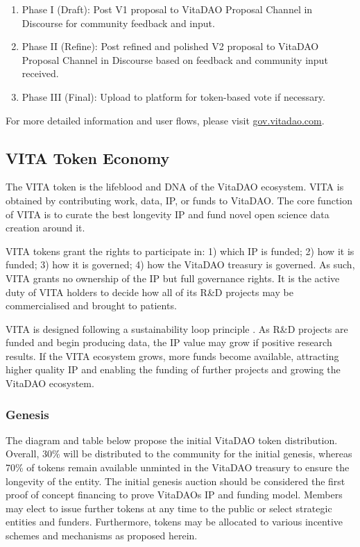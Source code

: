 \documentclass[12pt,letterpaper]{article}
\begin{document}
\begin{enumerate}
\item Phase I (Draft): Post V1 proposal to VitaDAO Proposal Channel in Discourse for community feedback and input.
\item Phase II (Refine): Post refined and polished V2 proposal to VitaDAO Proposal Channel in Discourse based on feedback and community input received.
\item Phase III (Final): Upload to platform for token-based vote if necessary.
\end{enumerate}

\noindent For more detailed information and user flows, please visit \url{gov.vitadao.com}.

\subsection{VITA Token Economy}
The VITA token is the lifeblood and DNA of the VitaDAO ecosystem. VITA is obtained by contributing work, data, IP, or funds to VitaDAO. The core function of VITA is to curate the best longevity IP and fund novel open science data creation around it.

VITA tokens grant the rights to participate in: 1) which IP is funded; 2) how it is funded; 3) how it is governed; 4) how the VitaDAO treasury is governed. As such, VITA grants no ownership of the IP but full governance rights. It is the active duty of VITA holders to decide how all of its R\&D projects may be commercialised and brought to patients.

VITA is designed following a sustainability loop principle \citep{Web3Sustain}. As R\&D projects are funded and begin producing data, the IP value may grow if positive research results. If the VITA ecosystem grows, more funds become available, attracting higher quality IP and enabling the funding of further projects and growing the VitaDAO ecosystem.

\subsubsection{Genesis}
The diagram and table below propose the initial VitaDAO token distribution. Overall, 30\% will be distributed to the community for the initial genesis, whereas 70\% of tokens remain available unminted in the VitaDAO treasury to ensure the longevity of the entity. The initial genesis auction should be considered the first proof of concept financing to prove VitaDAOs IP and funding model. Members may elect to issue further tokens at any time to the public or select strategic entities and funders. Furthermore, tokens may be allocated to various incentive schemes and mechanisms as proposed herein.
\end{document}
